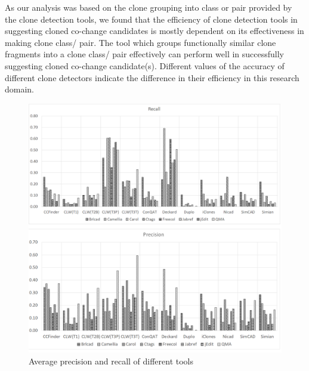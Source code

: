 \documentclass[review]{elsarticle}
\begin{document}
As our analysis was based on the clone grouping into class or pair provided by the clone detection tools, we found that the efficiency of clone detection tools in suggesting cloned co-change candidates is mostly dependent on its effectiveness in making clone class/ pair. The tool which groups functionally similar clone fragments into a clone class/ pair effectively can perform well in successfully suggesting cloned co-change candidate(s). Different values of the accuracy of different clone detectors indicate the difference in their efficiency in this research domain. 

\begin{figure}
\centering
\includegraphics[width=\textwidth] {AveragePrecisionRecall.png}
\caption{Average precision and recall of different tools}
\label{fig:AveragePrecisionRecall}
\end{figure}

\end{document}
